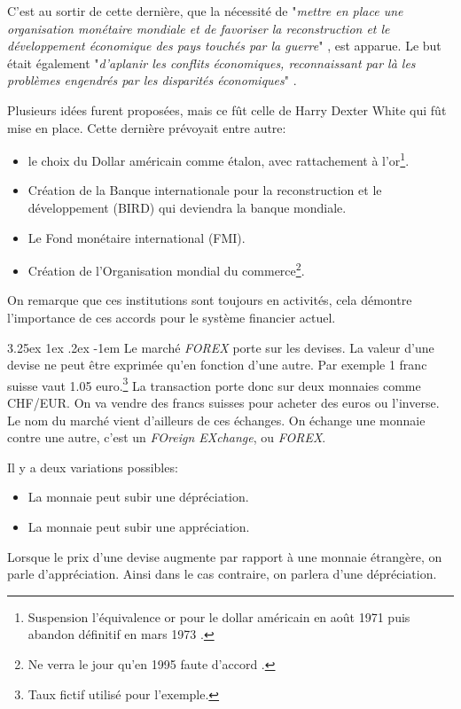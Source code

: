 \documentclass[a4paper, 11pt]{article}
\makeatletter
\renewcommand\paragraph{\@startsection{paragraph}{5}{\z@}%
  {3.25ex \@plus1ex \@minus.2ex}%
  {-1em}%
  {\normalfont\normalsize\bfseries}}
\makeatother
\begin{document}
C'est au sortir de cette dernière, que la nécessité de "\textit{mettre en place une organisation monétaire mondiale et de favoriser la reconstruction et le développement économique des pays touchés par la guerre}" \cite{wikipedia_bretten_woods}, est apparue. Le but était également "\textit{d’aplanir les conflits économiques, reconnaissant par là les problèmes engendrés par les disparités économiques}" \cite{etalon_or_a_etalon_dollar}.

Plusieurs idées furent proposées, mais ce fût celle de Harry Dexter White qui fût mise en place. Cette dernière prévoyait entre autre:
\begin{itemize}
\item le choix du Dollar américain comme étalon, avec rattachement à l'or\footnote{Suspension l'équivalence or pour le dollar américain en août 1971 puis abandon définitif en mars 1973 \cite{wikipedia_bretten_woods}.}.
\item Création de la Banque internationale pour la reconstruction et le développement (BIRD) qui deviendra la banque mondiale.
\item Le Fond monétaire international (FMI).
\item Création de l'Organisation mondial du commerce\footnote{Ne verra le jour qu'en 1995 faute d'accord \cite{wikipedia_bretten_woods}.}.
\end{itemize}

On remarque que ces institutions sont toujours en activités, 
cela démontre l'importance de ces accords pour le système financier actuel.

\paragraph{}
Le marché \textit{FOREX} porte sur les devises. La valeur d'une devise ne peut être exprimée qu'en fonction d'une autre. 
Par exemple 1 franc suisse vaut 1.05 euro.\footnote{Taux fictif utilisé pour l'exemple.}
La transaction porte donc sur deux monnaies comme CHF/EUR. On va vendre des francs suisses pour acheter des euros ou l'inverse.
Le nom du marché vient d'ailleurs de ces échanges. 
On échange une monnaie contre une autre, c'est un \textit{FOreign EXchange}, ou \textit{FOREX}.

Il y a deux variations possibles:
\begin{itemize}
\item La monnaie peut subir une dépréciation.
\item La monnaie peut subir une appréciation.
\end{itemize}
Lorsque le prix d'une devise augmente par rapport à une monnaie étrangère, on parle d'appréciation. 
Ainsi dans le cas contraire, on parlera d'une dépréciation.
\end{document}
